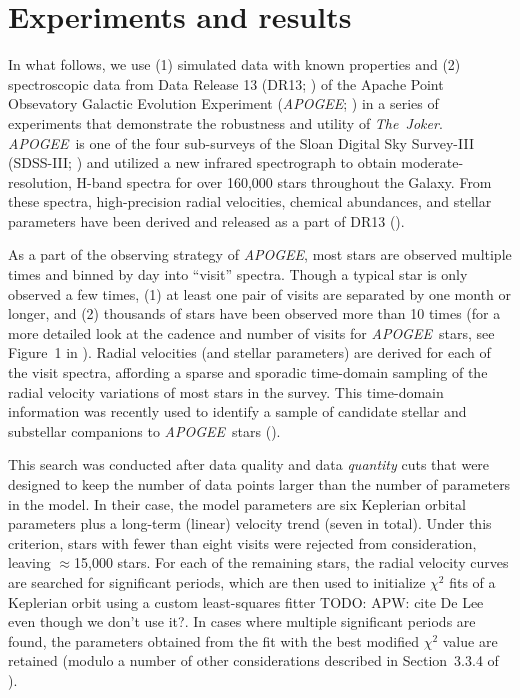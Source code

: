 \documentclass[manuscript, letterpaper]{aastex6}
\newcommand{\project}[1]{\textsl{#1}}
\newcommand{\acronym}[1]{{\small{#1}}}
\newcommand{\apogee}{\project{\acronym{APOGEE}}}
\newcommand{\samplername}{\project{The~Joker}}
\newcommand{\sectionname}{Section}
\newcommand{\figname}{Figure}
\newcommand{\todo}[1]{{\color{red}TODO: #1}}
\begin{document}
\section{Experiments and results} \label{sec:experiments}

In what follows, we use (1) simulated data with known properties and (2)
spectroscopic data from Data Release 13 (DR13;
\citealt{SDSS-Collaboration:2016}) of the Apache Point Obsevatory Galactic
Evolution Experiment (\apogee; \citealt{Majewski:2015}) in a series of
experiments that demonstrate the robustness and utility of \samplername.
\apogee\ is one of the four sub-surveys of the Sloan Digital Sky Survey-III
(SDSS-III; \citealt{Eisenstein:2011}) and utilized a new infrared spectrograph
to obtain moderate-resolution, H-band spectra for over 160,000 stars throughout
the Galaxy.
From these spectra, high-precision radial velocities, chemical abundances, and
stellar parameters have been derived and released as a part of DR13
(\citealt{Holtzman:2015,Nidever:2015}).

As a part of the observing strategy of \apogee, most stars are observed
multiple times and binned by day into ``visit'' spectra.
Though a typical star is only observed a few times, (1) at least one pair of
visits are separated by one month or longer, and (2) thousands of stars have
been observed more than 10 times (for a more detailed look at the cadence and
number of visits for \apogee\ stars, see \figname~1 in \citealt{Troup:2016}).
Radial velocities (and stellar parameters) are derived for each of the visit
spectra, affording a sparse and sporadic time-domain sampling of the radial
velocity variations of most stars in the survey.
This time-domain information was recently used to identify a sample of
candidate stellar and substellar companions to \apogee\ stars
(\citealt{Troup:2016}).

This search was conducted after data quality and data \emph{quantity} cuts that
were designed to keep the number of data points larger than the number of
parameters in the model.
In their case, the model parameters are six Keplerian orbital parameters plus a
long-term (linear) velocity trend (seven in total).
Under this criterion, stars with fewer than eight visits were rejected from
consideration, leaving $\approx$15,000 stars.
For each of the remaining stars, the radial velocity curves are searched for
significant periods, which are then used to initialize $\chi^2$ fits of a
Keplerian orbit using a custom least-squares fitter \todo{APW: cite De Lee even
though we don't use it?}.
In cases where multiple significant periods are found, the parameters obtained
from the fit with the best modified $\chi^2$ value are retained (modulo a
number of other considerations described in \sectionname~3.3.4 of
\citealt{Troup:2016}).
\end{document}

